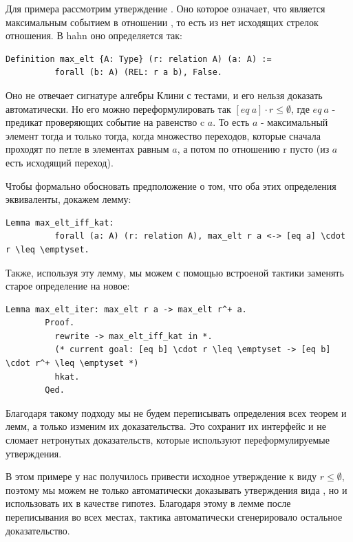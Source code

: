 \documentclass[times
              ]{itmo-student-thesis}
\begin{document}
      Для примера рассмотрим утверждение .
      Оно которое означает, что  является максимальным событием в отношении , то есть из  нет исходящих
      стрелок отношения. В hahn оно определяется так:

      \begin{lstlisting}[mathescape=true, language=coq] % TODO опции float???
        Definition max_elt {A: Type} (r: relation A) (a: A) :=
          forall (b: A) (REL: r a b), False.
      \end{lstlisting}

      Оно не отвечает сигнатуре алгебры Клини с тестами, и его нельзя доказать автоматически.
      Но его можно переформулировать так $ [eq\ a] \cdot r \le \emptyset $, где $eq\ a$ - предикат проверяющих событие на равенство
      c $a$.  
      То есть $ a $ - максимальный элемент тогда и только тогда, когда множество переходов, которые сначала
      проходят по петле в элементах равным $a$, а потом по отношению r пусто (из $a$ есть исходящий переход).

      Чтобы формально обосновать предположение о том, что оба этих определения эквиваленты, докажем лемму:
      \begin{lstlisting}[mathescape=true, language=coq]
        Lemma max_elt_iff_kat:
          forall (a: A) (r: relation A), max_elt r a <-> [eq a] \cdot r \leq \emptyset.
      \end{lstlisting}

      Также, используя эту лемму, мы можем с помощью встроеной тактики  заменять старое определение на новое:
      
      \begin{lstlisting}[language=coq, mathescape=true]
        Lemma max_elt_iter: max_elt r a -> max_elt r^+ a.
        Proof.
          rewrite -> max_elt_iff_kat in *.
          (* current goal: [eq b] \cdot r \leq \emptyset -> [eq b] \cdot r^+ \leq \emptyset *)
          hkat.
        Qed.
      \end{lstlisting}
      
      Благодаря такому подходу мы не будем переписывать определения всех теорем и лемм, а только изменим их доказательства.
      Это сохранит их интерфейс и не сломает нетронутых доказательств, которые используют переформулируемые утверждения.

      В этом примере у нас получилось привести исходное утверждение к виду $r \leq \emptyset$, поэтому мы можем не только
      автоматически доказывать утверждения вида , но и использовать их в качестве гипотез.
      Благодаря этому в лемме  после переписывания  во всех местах, тактика 
      автоматически сгенерировало остальное доказательство.
\end{document}
